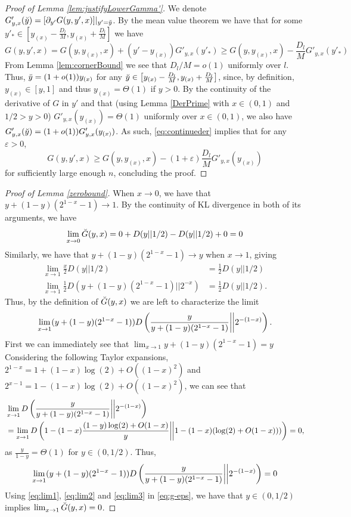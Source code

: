 \documentclass[12pt,reqno]{amsart}
\numberwithin{equation}{section}
\theoremstyle{definition}
\renewcommand{\epsilon}{\varepsilon}
\newcommand{\conv}[1]{\overset{#1}{\rightarrow}}
\newcommand{\gl}{y + (1-y)(2^{1-x} - 1)}
\renewcommand{\[}{\begin{equation}}
\renewcommand{\]}{\end{equation}}
\renewcommand{\|}{\bigg{|}}
\begin{document}
\begin{proof}[Proof of Lemma \ref{lem:justifyLowerGamma'}]
    We denote $G'_{y,x}(\Breve{y}) = [\partial_{y'}G(y, y', x)]|_{y' = \Breve{y}}$. By the mean value theorem we have that for some $y'_* \in \left[y_{(x)} - \frac{D_l}{M}, y_{(x)} + \frac{D_l}{M}\right]$ we have
    \[
        G(y, y', x) = G(y, y_{(x)}, x) + (y' - y_{(x)})G'_{y,x}(y'_*) \geq G(y, y_{(x)}, x) - \frac{D_l}{M}G'_{y,x}(y'_*)\label{eq:continueder}
    \]
    From Lemma \ref{lem:cornerBound} we see that $D_l/M = o(1)$ uniformly over $l$. Thus,
    $\Breve{y} = (1+o(1))y_{(x)}$ for any $\Breve{y} \in \left[y_{(x)} - \frac{D_l}{M}, y_{(x)} + \frac{D_l}{M}\right]$, since, by definition, $y_{(x)} \in [y,1]$ and thus $y_{(x)} = \Theta(1)$ if $y > 0$. By the continuity of the derivative of $G$ in $y'$ and that (using Lemma \ref{DerPrime} with $x \in (0,1)$ and $1/2 > y > 0$) $G'_{y,x}(y_{(x)}) = \Theta(1)$ uniformly over $x \in (0,1)$, we also have $G'_{y,x}(\Breve{y}) = (1+o(1))G'_{y,x}(y_{(x)})$. As such,  \eqref{eq:continueder} implies that for any $\epsilon > 0$,
    \[G(y, y', x) \geq G(y, y_{(x)}, x) - (1 + \epsilon)\frac{D_l}{M}G'_{y,x}(y_{(x)})\]
    for sufficiently large enough $n$, concluding the proof.
\end{proof}

\begin{proof}[Proof of Lemma \ref{zerobound}]
When $x \conv{} 0$, we have that $\gl \conv{} 1$. By the continuity of KL divergence in both of its arguments, we have
    \[\lim_{x \conv{} 0}\Breve{G}(y, x) = 0 + D(y||1/2) - D(y||1/2) + 0 = 0\]
    Similarly, we have that $\gl \conv{} y$ when $x \conv{} 1$, giving
    \begin{align}
        \lim_{x \conv{} 1}\frac{x}{2}D(y||1/2) &= \frac{1}{2}D(y||1/2)\label{eq:lim1}\\
        \lim_{x \conv{} 1}\frac{1}{2}D(\gl||2^{-x}) &= \frac{1}{2}D(y||1/2).\label{eq:lim2}
    \end{align}
    Thus, by the definition of $\Breve{G}(y,x)$ we are left to characterize the limit
    \[\lim_{x \conv{} 1}(\gl) D\left(\frac{y}{\gl}\|\|2^{-(1-x)}\right).\]
    First we can immediately see that $\lim_{x \conv{} 1}\gl = y$
    Considering the following Taylor expansions, $2^{1-x} = 1 + (1-x)\log(2) + O((1-x)^2)$ and $2^{x - 1} = 1 - (1-x)\log(2) + O((1-x)^2)$, we can see that
    \begin{align}&\lim_{x \conv{} 1}D\left(\frac{y}{\gl}\|\|2^{-(1-x)}\right) \\
    &= \lim_{x \conv{} 1} D\left(1 - (1-x)\frac{(1-y)\log(2) + O(1-x)}{y}\|\|1 - (1-x)(\log(2) + O(1-x))) \right) = 0,\end{align}
    as $\frac{y}{1-y} = \Theta(1)$ for $y \in (0,1/2)$. Thus, 
    \[\lim_{x \conv{} 1}(\gl) D\left(\frac{y}{\gl}\|\|2^{-(1-x)}\right) = 0\label{eq:lim3}\]
    Using \eqref{eq:lim1}, \eqref{eq:lim2} and \eqref{eq:lim3} in \eqref{eq:g-eps}, we have that $y \in (0,1/2)$ implies $\lim_{x \conv{} 1}\Breve{G}(y, x) = 0$.
    \end{proof}
\end{document}
